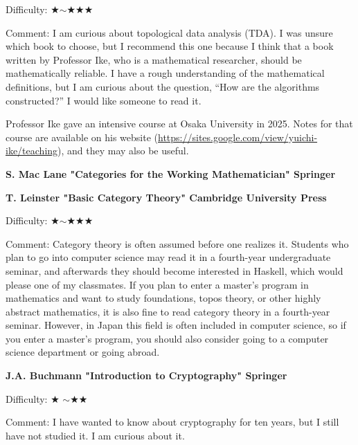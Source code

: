 Difficulty: ★$\sim$★★★\vspace{-6pt} 

Comment: I am curious about topological data analysis (TDA). I was unsure which book to choose, but I recommend this one because I think that a book written by Professor Ike, who is a mathematical researcher, should be mathematically reliable. I have a rough understanding of the mathematical definitions, but I am curious about the question, ``How are the algorithms constructed?'' I would like someone to read it.

Professor Ike gave an intensive course at Osaka University in 2025. Notes for that course are available on his website (\url{https://sites.google.com/view/yuichi-ike/teaching}), and they may also be useful.
\vspace{8pt}

\textbf{S. Mac Lane "Categories for the Working Mathematician" Springer}  　\vspace{-6pt} 

\textbf{T. Leinster "Basic Category Theory" Cambridge University Press}  　\vspace{-6pt} 

Difficulty: ★$\sim$★★★ \vspace{-6pt} 

Comment: Category theory is often assumed before one realizes it. Students who plan to go into computer science may read it in a fourth-year undergraduate seminar, and afterwards they should become interested in Haskell, which would please one of my classmates.
 If you plan to enter a master's program in mathematics and want to study foundations, topos theory, or other highly abstract mathematics, it is also fine to read category theory in a fourth-year seminar. However, in Japan this field is often included in computer science, so if you enter a master's program, you should also consider going to a computer science department or going abroad.

\vspace{8pt}

\textbf{J.A. Buchmann "Introduction to Cryptography" Springer}  　\vspace{-6pt} 

Difficulty: ★ $\sim$★★\vspace{-6pt} 

Comment: I have wanted to know about cryptography for ten years, but I still have not studied it. I am curious about it.
\vspace{8pt}

